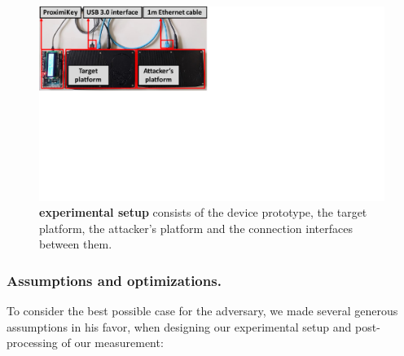 \begin{figure}[t]
  \centering
    \includegraphics[trim={0 11cm 17cm 0}, clip, width=0.6\linewidth]{chapters/ProximiTEE/figures/Setup2.pdf}
    \caption[\name experimental setup]{\textbf{\name experimental setup} consists of the \device device prototype, the target platform, the attacker's platform and the connection interfaces between them.}

    \label{fig:setup}
\end{figure}

\subsubsection{Assumptions and optimizations.}
To consider the best possible case for the adversary, we made several generous assumptions in his favor, when designing our experimental setup and post-processing of our measurement:

